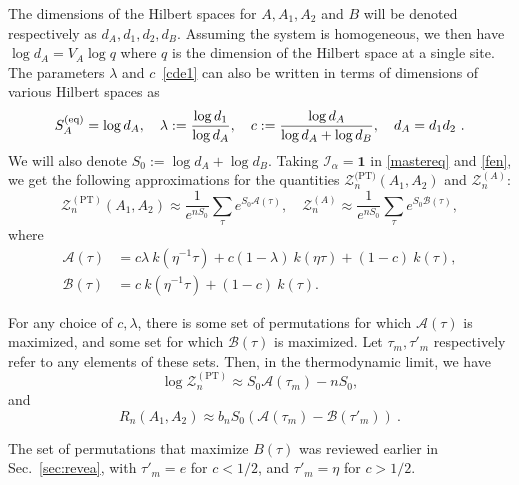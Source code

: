\documentclass[a4paper,11pt]{article}
\newcommand{\Zpt}{\sZ_n^{(\text{PT})}}
\newcommand{\be}{\begin{equation}}
\newcommand{\ee}{\end{equation}}
\newcommand\al{{\alpha}}
\newcommand\lam{\lambda}
\newcommand\ov{\over}
\def\ri{\right}
\newcommand\sA{{\ensuremath{{\mathcal A}}}}
\newcommand\sB{{\ensuremath{{\mathcal B}}}}
\newcommand\sI{{\ensuremath{{\mathcal I}}}}
\newcommand\sZ{{\mathcal Z}}
\begin{document}
The dimensions of the Hilbert spaces for $A, A_1, A_2$ and $B$ will be denoted respectively as $d_A, d_1, d_2, d_B$. 
Assuming the system is homogeneous, we then have $\log d_A = V_A \log q$ where $q$ is the dimension of the Hilbert space at a single site. The parameters $\lam$ and $c$~\eqref{cde1} can also be written in terms of dimensions of various Hilbert spaces as 
\be
S_A^{(\rm eq)} = \log d_A , \quad \lam := {\log d_1 \ov \log d_A} , \quad
c := {\log d_A \ov \log d_A + \log d_B} , \quad d_A = d_1 d_2 \ .
\ee
We will also denote $S_0 := \log d_A + \log d_B$. 
 Taking $\sI_{\al}= \mathbf{1}$ in \eqref{mastereq} and \eqref{fen}, we get the following approximations for the quantities $\sZ_n^{\text{(PT)}}(A_1, A_2)$ and $\sZ_n^{(A)}$:
\be
\sZ_n^{(\text{PT})}(A_1, A_2) \approx \frac{1}{e^{n S_0}} \sum_{\tau} e^{S_0 \sA(\tau)}, \quad \sZ_n^{(A)} \approx \frac{1}{e^{nS_0}} \sum_{\tau} e^{S_0 \sB(\tau)},
\ee
where 
\begin{align} 
\label{AB}
\sA(\tau) &= c\lambda~ k(\eta^{-1}\tau)+ c (1-\lambda)~ k(\eta\tau) + (1-c)~ k(\tau), \\ \sB(\tau) &= c~ k(\eta^{-1}\tau)+ (1-c)~ k(\tau).
\end{align}

For any choice of $c, \lambda$, there is some
set of permutations for which $\sA(\tau)$ is maximized, and some set for which $\sB(\tau)$ is maximized. Let $\tau_m, \tau'_{m}$ respectively refer to any elements of these sets. Then, in the thermodynamic limit, we have 
\be 
\log\Zpt \approx S_0 \sA(\tau_m) - n S_0, %
\ee
and 
\be 
 R_n(A_1, A_2) \approx b_n S_0 \left(\sA(\tau_m)-\sB(\tau'_m) \ri) \ . %
\ee

The set of permutations that maximize $B(\tau)$ was reviewed earlier in Sec.~\ref{sec:revea}, with $\tau'_m = e$ for $c<1/2$, and
$\tau'_m = \eta$ for $c>1/2$.

\iffalse 
has already been 
Let us first find the set of permutations that maximize $B(\tau)$. Note that the expression for $\sB(\tau)$ in \eqref{AB} can be rewritten in two ways, 
\be 
\sB(\tau)= (1-c)(k(\tau)+k(\eta^{-1}\tau)) + (2c-1) k(\eta^{-1}\tau) ~=~ c (k(\tau)+k(\eta^{-1}\tau)) + (1-2c)k(\tau)
\ee
Recall that while $k(\tau)$ and $k(\eta^{-1}\tau)$ cannot both reach their maximum value for any given $\tau$, $k(\tau)$ and $k(\tau \eta^{-1})+k(\tau)$ both reach their maximum values for $\tau=e$, and $k(\eta^{-1}\tau)$ and $k(\eta^{-1}\tau )+k(\tau)$ both reach their maximum values for $\tau=\eta$. Hence, $\tau'_m = e$ for $c<1/2$, and
$\tau'_m = \eta$ for $c>1/2$.
\fi
\end{document}
